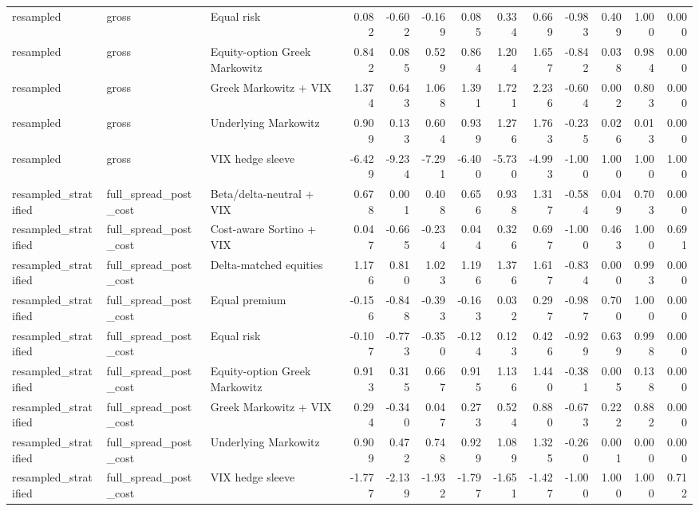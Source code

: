 \begin{tabular}{lllrrrrrrrrrr}
resampled & gross & Equal risk & 0.082 & -0.602 & -0.169 & 0.085 & 0.334 & 0.669 & -0.983 & 0.409 & 1.000 & 0.000 \\
resampled & gross & Equity-option Greek Markowitz & 0.842 & 0.085 & 0.529 & 0.864 & 1.204 & 1.657 & -0.842 & 0.038 & 0.984 & 0.000 \\
resampled & gross & Greek Markowitz + VIX & 1.374 & 0.643 & 1.068 & 1.391 & 1.721 & 2.236 & -0.604 & 0.002 & 0.803 & 0.000 \\
resampled & gross & Underlying Markowitz & 0.909 & 0.133 & 0.604 & 0.939 & 1.276 & 1.763 & -0.235 & 0.026 & 0.013 & 0.000 \\
resampled & gross & VIX hedge sleeve & -6.429 & -9.234 & -7.291 & -6.400 & -5.730 & -4.993 & -1.000 & 1.000 & 1.000 & 1.000 \\
resampled\_stratified & full\_spread\_post\_cost & Beta/delta-neutral + VIX & 0.678 & 0.001 & 0.408 & 0.656 & 0.938 & 1.317 & -0.584 & 0.049 & 0.703 & 0.000 \\
resampled\_stratified & full\_spread\_post\_cost & Cost-aware Sortino + VIX & 0.047 & -0.665 & -0.234 & 0.044 & 0.326 & 0.697 & -1.000 & 0.463 & 1.000 & 0.691 \\
resampled\_stratified & full\_spread\_post\_cost & Delta-matched equities & 1.176 & 0.810 & 1.023 & 1.196 & 1.376 & 1.617 & -0.834 & 0.000 & 0.993 & 0.000 \\
resampled\_stratified & full\_spread\_post\_cost & Equal premium & -0.156 & -0.848 & -0.393 & -0.163 & 0.032 & 0.297 & -0.987 & 0.700 & 1.000 & 0.000 \\
resampled\_stratified & full\_spread\_post\_cost & Equal risk & -0.107 & -0.773 & -0.350 & -0.124 & 0.123 & 0.426 & -0.929 & 0.639 & 0.998 & 0.000 \\
resampled\_stratified & full\_spread\_post\_cost & Equity-option Greek Markowitz & 0.913 & 0.315 & 0.667 & 0.915 & 1.136 & 1.440 & -0.381 & 0.005 & 0.138 & 0.000 \\
resampled\_stratified & full\_spread\_post\_cost & Greek Markowitz + VIX & 0.294 & -0.340 & 0.047 & 0.273 & 0.524 & 0.880 & -0.673 & 0.222 & 0.882 & 0.000 \\
resampled\_stratified & full\_spread\_post\_cost & Underlying Markowitz & 0.909 & 0.472 & 0.748 & 0.929 & 1.089 & 1.325 & -0.260 & 0.001 & 0.000 & 0.000 \\
resampled\_stratified & full\_spread\_post\_cost & VIX hedge sleeve & -1.777 & -2.139 & -1.932 & -1.797 & -1.651 & -1.427 & -1.000 & 1.000 & 1.000 & 0.712 \\

\end{tabular}
